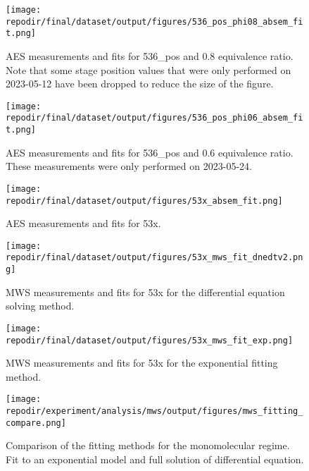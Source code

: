 \begin{figure}[]
\centering
\texttt{[image: \\repodir/final/dataset/output/figures/536\_pos\_phi08\_absem\_fit.png]}
\caption{AES measurements and fits for 536\_pos and 0.8 equivalence ratio. Note that some stage position values that were only performed on 2023-05-12 have been dropped to reduce the size of the figure. }
\label{fig:SI_536_pos_phi08_absem_fit}
\end{figure}

\begin{figure}[]
\centering
\texttt{[image: \\repodir/final/dataset/output/figures/536\_pos\_phi06\_absem\_fit.png]}
\caption{AES measurements and fits for 536\_pos and 0.6 equivalence ratio. These measurements were only performed on 2023-05-24.}
\label{fig:SI_536_pos_phi06_absem_fit}
\end{figure}

\begin{figure}[]
\centering
\texttt{[image: \\repodir/final/dataset/output/figures/53x\_absem\_fit.png]}
\caption{AES measurements and fits for 53x.}
\label{fig:SI_53x_absem_fit}
\end{figure}

\begin{figure}[]
\centering
\texttt{[image: \\repodir/final/dataset/output/figures/53x\_mws\_fit\_dnedtv2.png]}
\caption{MWS measurements and fits for 53x for the differential equation solving method. }
\label{fig:SI_53x_mws_fit_dnedtv2}
\end{figure}

\begin{figure}[]
\centering
\texttt{[image: \\repodir/final/dataset/output/figures/53x\_mws\_fit\_exp.png]}
\caption{MWS measurements and fits for 53x for the exponential fitting method. }
\label{fig:SI_53x_mws_fit_exp}
\end{figure}

\begin{figure}
\centering
\texttt{[image: \\repodir/experiment/analysis/mws/output/figures/mws\_fitting\_compare.png]}
\caption{Comparison of the fitting methods for the monomolecular regime. Fit to an exponential model and full solution of differential equation. }
\label{fig:SI_mws_fitting_compare}
\end{figure}